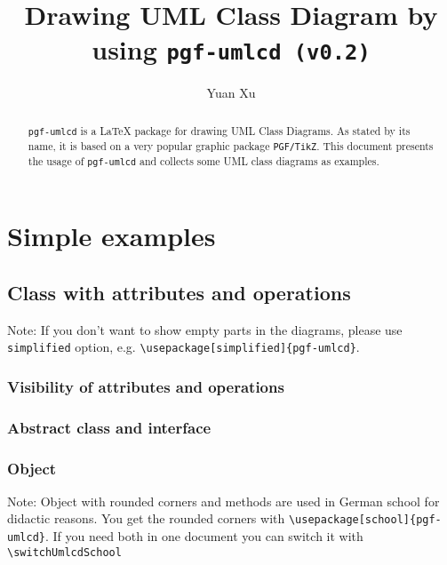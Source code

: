\documentclass{article}
\newcommand{\demo}[2][1]{
\begin{minipage}{.49\linewidth}
\centering
\resizebox{#1\linewidth}{!}{

}
\end{minipage}
\hspace{0.01\linewidth}
\begin{minipage}{.5\linewidth}

\end{minipage}
}
\begin{document}
\title{Drawing UML Class Diagram by using \texttt{pgf-umlcd (v0.2)}}
\author{Yuan Xu}
\maketitle

\begin{abstract}
  \texttt{pgf-umlcd} is a LaTeX package for drawing UML Class
  Diagrams. As stated by its name, it is based on a very popular
  graphic package \texttt{PGF/TikZ}. This document presents the usage
  of \texttt{pgf-umlcd} and collects some UML class diagrams as
  examples.
\end{abstract}

\tableofcontents

\section{Simple examples}
\subsection{Class with attributes and operations}
Note: If you don't want to show empty parts in the diagrams, please
use \texttt{simplified} option, e.g. \lstinline|\usepackage[simplified]{pgf-umlcd}|.\\
\demo{class}

\subsubsection{Visibility of attributes and operations}
\demo[0.8]{visibility}

\subsubsection{Abstract class and interface}
\demo[0.5]{abstract-class}
\demo[0.5]{interface}

\subsubsection{Object}
\demo[0.7]{object}
Note: Object with rounded corners and methods are used in German school for didactic reasons. You get the rounded corners with \lstinline|\usepackage[school]{pgf-umlcd}|. If you need both in one document you can switch it with \lstinline|\switchUmlcdSchool| \\
\switchUmlcdSchool
\demo[0.7]{object}
\demo[0.7]{object-include-methods}
\end{document}
